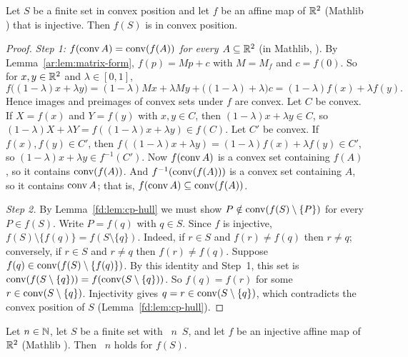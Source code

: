 \begin{lemma}\label{ar:lem:cp-affine}
Let $S$ be a finite set in convex position and let $f$ be an affine map of $\mathbb R^2$ \textup(Mathlib
\textup) that is injective. Then $f(S)$ is in convex position.
\end{lemma}

\begin{proof}
\emph{Step 1: $f(\operatorname{conv} A)=\operatorname{conv}(f(A))$ for every $A\subseteq\mathbb R^2$} (in Mathlib, ). By
Lemma~\ref{ar:lem:matrix-form}, $f(p)=Mp+c$ with $M=M_f$ and $c=f(0)$. So for $x,y\in\mathbb R^2$ and $\lambda\in[0,1]$,
\[
f\bigl((1-\lambda)x+\lambda y\bigr)=(1-\lambda)Mx+\lambda My+\bigl((1-\lambda)+\lambda\bigr)c
=(1-\lambda)f(x)+\lambda f(y).
\]
Hence images and preimages of convex sets under $f$ are convex. Let $C$ be convex. If $X=f(x)$ and $Y=f(y)$ with
$x,y\in C$, then $(1-\lambda)x+\lambda y\in C$, so $(1-\lambda)X+\lambda Y=f((1-\lambda)x+\lambda y)\in f(C)$. Let
$C'$ be convex. If $f(x),f(y)\in C'$, then $f((1-\lambda)x+\lambda y)=(1-\lambda)f(x)+\lambda f(y)\in C'$, so
$(1-\lambda)x+\lambda y\in f^{-1}(C')$. Now $f(\operatorname{conv} A)$ is a convex set containing $f(A)$, so
it contains $\operatorname{conv}(f(A))$. And $f^{-1}(\operatorname{conv}(f(A)))$ is a convex set containing $A$, so it contains $\operatorname{conv} A$; that is,
$f(\operatorname{conv} A)\subseteq\operatorname{conv}(f(A))$.

\emph{Step 2.} By Lemma~\ref{fd:lem:cp-hull} we must show $P\notin\operatorname{conv}(f(S)\setminus\{P\})$ for every $P\in f(S)$.
Write $P=f(q)$ with $q\in S$. Since $f$ is injective, $f(S)\setminus\{f(q)\}=f(S\setminus\{q\})$. Indeed, if $r\in S$
and $f(r)\ne f(q)$ then $r\ne q$; conversely, if $r\in S$ and $r\ne q$ then $f(r)\ne f(q)$. Suppose
$f(q)\in\operatorname{conv}(f(S)\setminus\{f(q)\})$. By this identity and Step~1, this set is
$\operatorname{conv}(f(S\setminus\{q\}))=f(\operatorname{conv}(S\setminus\{q\}))$. So $f(q)=f(r)$ for some $r\in\operatorname{conv}(S\setminus\{q\})$.
Injectivity gives $q=r\in\operatorname{conv}(S\setminus\{q\})$, which contradicts the convex position of $S$
(Lemma~\ref{fd:lem:cp-hull}).
\end{proof}

\begin{lemma}\label{ar:lem:ngon-affine}
Let $n\in\mathbb N$, let $S$ be a finite set with ~$n$~$S$, and let $f$ be an injective affine map of $\mathbb R^2$
\textup(Mathlib \textup). Then ~$n$ holds for $f(S)$.
\end{lemma}

